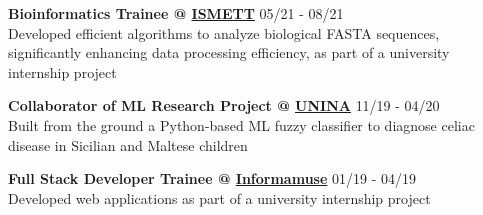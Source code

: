 \documentclass[11pt,letterpaper]{article}
\begin{document}
\begin{justify}
\begin{itemize}[label={}, leftmargin=0pt]
\begin{item}
            \end{item}
            \begin{item}
                  \textbf{Bioinformatics Trainee @ \href{https://www.ismett.edu/en/}{ISMETT}}
                  \hfill
                  \small{05/21 - 08/21}
                  \\
                  Developed efficient algorithms to analyze biological FASTA sequences, significantly enhancing data processing efficiency, as part of a university internship project
            \end{item}
            \begin{item}
                  \textbf{Collaborator of ML Research Project @ \href{https://www.unina.it/en_GB}{UNINA}}
                  \hfill
                  \small{11/19 - 04/20}
                  \\
                  Built from the ground a Python-based ML fuzzy classifier to diagnose celiac disease in Sicilian and Maltese children
            \end{item}
            \begin{item}
                  \textbf{Full Stack Developer Trainee @ \href{https://www.informamuse.com/en/home/}{Informamuse}}
                  \hfill
                  \small{01/19 - 04/19}
                  \\
                  Developed web applications as part of a university internship project
            \end{item}
      \end{itemize}


\end{justify}
\end{document}
